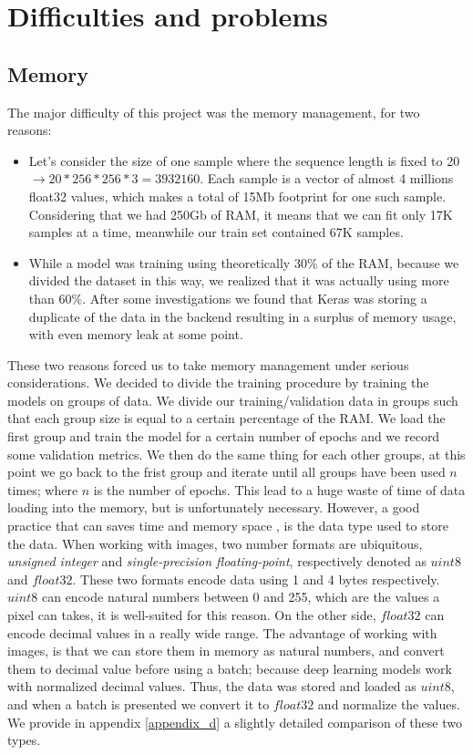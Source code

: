 \documentclass[12pt, a4paper]{report}
\begin{document}
		\section{Difficulties and problems}\label{difficulties}
			\subsection{Memory}\label{memory}
				The major difficulty of this project was the memory management, for two reasons:
				\begin{itemize}
					\item Let's consider the size of one sample where the sequence length is fixed to 20 $\rightarrow 20*256*256*3 = 3932160$. Each sample is a vector of almost 4 millions float32 values, which makes a total of 15Mb footprint for one such sample.
					Considering that we had 250Gb of RAM, it means that we can fit only 17K samples at a time, meanwhile our train set contained 67K samples.
					\item While a model was training using theoretically 30\% of the RAM, because we divided the dataset in this way, we realized that it was actually using more than 60\%.
					After some investigations we found that Keras was storing a duplicate of the data in the backend resulting in a surplus of memory usage, with even memory leak at some point.
				\end{itemize}
				These two reasons forced us to take memory management under serious considerations.
				We decided to divide the training procedure by training the models on groups of data.
				We divide our training/validation data in groups such that each group size is equal to a certain percentage of the RAM.
				We load the first group and train the model for a certain number of epochs and we record some validation metrics.
				We then do the same thing for each other groups, at this point we go back to the frist group and iterate until all groups have been used $n$ times; where $n$ is the number of epochs.
				This lead to a huge waste of time of data loading into the memory, but is unfortunately necessary.
				However, a good practice that can saves time and memory space , is the data type used to store the data.
				When working with images, two number formats are ubiquitous, {\itshape unsigned integer} and {\itshape single-precision floating-point}, respectively denoted as $uint8$ and $float32$.
				These two formats encode data using 1 and 4 bytes respectively.
				$uint8$ can encode natural numbers between 0 and 255, which are the values a pixel can takes, it is well-suited for this reason.
				On the other side, $float32$ can encode decimal values in a really wide range.
				The advantage of working with images, is that we can store them in memory as natural numbers, and convert them to decimal value before using a batch; because deep learning models work with normalized decimal values.
				Thus, the data was stored and loaded as $uint8$, and when a batch is presented we convert it to $float32$ and normalize the values.
				We provide in appendix \ref{appendix_d} a slightly detailed comparison of these two types.
\end{document}
